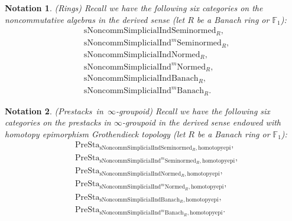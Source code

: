 \documentclass[12pt]{book}
\newtheorem{notation}{Notation}
\begin{document}
\begin{notation}\mbox{\rm{(Rings)}}
Recall we have the following six categories on the noncommutative algebras in the derived sense (let $R$ be a Banach ring or $\mathbb{F}_1$):
\begin{align}
&\mathrm{sNoncomm}\mathrm{Simplicial}\mathrm{Ind}\mathrm{Seminormed}_R,\\
&\mathrm{sNoncomm}\mathrm{Simplicial}\mathrm{Ind}^m\mathrm{Seminormed}_R,\\
&\mathrm{sNoncomm}\mathrm{Simplicial}\mathrm{Ind}\mathrm{Normed}_R,\\
&\mathrm{sNoncomm}\mathrm{Simplicial}\mathrm{Ind}^m\mathrm{Normed}_R,\\
&\mathrm{sNoncomm}\mathrm{Simplicial}\mathrm{Ind}\mathrm{Banach}_R,\\
&\mathrm{sNoncomm}\mathrm{Simplicial}\mathrm{Ind}^m\mathrm{Banach}_R.	
\end{align}
	
\end{notation}



\begin{notation}\mbox{\rm{(Prestacks in $\infty$-groupoid)}}
Recall we have the following six categories on the prestacks in $\infty$-groupoid in the derived sense endowed with homotopy epimorphism Grothendieck topology (let $R$ be a Banach ring or $\mathbb{F}_1$):
\begin{align}
&\mathrm{PreSta}_{\mathrm{sNoncomm}\mathrm{Simplicial}\mathrm{Ind}\mathrm{Seminormed}_R,\mathrm{homotopyepi}},\\
&\mathrm{PreSta}_{\mathrm{sNoncomm}\mathrm{Simplicial}\mathrm{Ind}^m\mathrm{Seminormed}_R,\mathrm{homotopyepi}},\\
&\mathrm{PreSta}_{\mathrm{sNoncomm}\mathrm{Simplicial}\mathrm{Ind}\mathrm{Normed}_R,\mathrm{homotopyepi}},\\
&\mathrm{PreSta}_{\mathrm{sNoncomm}\mathrm{Simplicial}\mathrm{Ind}^m\mathrm{Normed}_R,\mathrm{homotopyepi}},\\
&\mathrm{PreSta}_{\mathrm{sNoncomm}\mathrm{Simplicial}\mathrm{Ind}\mathrm{Banach}_R,\mathrm{homotopyepi}},\\
&\mathrm{PreSta}_{\mathrm{sNoncomm}\mathrm{Simplicial}\mathrm{Ind}^m\mathrm{Banach}_R,\mathrm{homotopyepi}}.	
\end{align}
	
\end{notation}
\end{document}
